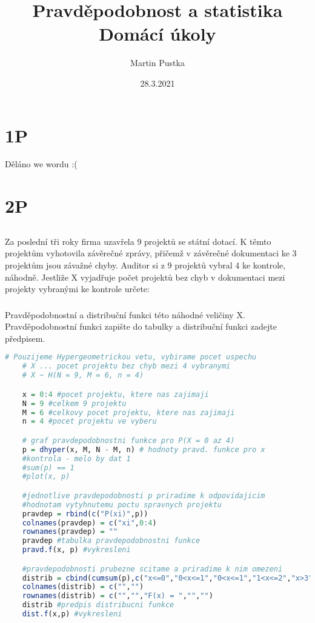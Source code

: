 \documentclass{article}%
\title{Pravděpodobnost a statistika\\
    \large Domácí úkoly}
\date{28.3.2021}
\author{Martin Pustka}
\begin{document}
\maketitle
\newpage
\tableofcontents
\newpage
\section{1P}
    Děláno we wordu :(
\newpage
\section{2P}

\subsection{}
Za poslední tři roky firma uzavřela 9 projektů se státní dotací. K těmto projektům vyhotovila závěrečné zprávy, přičemž v závěrečné dokumentaci ke 3 projektům jsou závažné chyby. Auditor si z 9 projektů  vybral 4 ke kontrole, náhodně. Jestliže X vyjadřuje počet projektů bez chyb v dokumentaci mezi projekty vybranými ke kontrole určete: 

\subsubsection{}
Pravděpodobnostní a distribuční funkci této náhodné veličiny X. Pravděpodobnostní funkci zapište do tabulky a distribuční funkci zadejte předpisem. 
\begin{lstlisting}[language=R, showstringspaces=false, basicstyle=\small]
    # Pouzijeme Hypergeometrickou vetu, vybirame pocet uspechu
    # X ... pocet projektu bez chyb mezi 4 vybranymi
    # X ~ H(N = 9, M = 6, n = 4)

    x = 0:4 #pocet projektu, ktere nas zajimaji
    N = 9 #celkem 9 projektu
    M = 6 #celkovy pocet projektu, ktere nas zajimaji
    n = 4 #pocet projektu ve vyberu

    # graf pravdepodobnostni funkce pro P(X = 0 az 4)
    p = dhyper(x, M, N - M, n) # hodnoty pravd. funkce pro x
    #kontrola - melo by dat 1
    #sum(p) == 1
    #plot(x, p)

    #jednotlive pravdepodobnosti p priradime k odpovidajicim 
    #hodnotam vytyhnutemu poctu spravnych projektu
    pravdep = rbind(c("P(xi)",p))
    colnames(pravdep) = c("xi",0:4)
    rownames(pravdep) = ""
    pravdep #tabulka pravdepodobnostni funkce
    pravd.f(x, p) #vykresleni

    #pravdepodobnosti prubezne scitame a priradime k nim omezeni
    distrib = cbind(cumsum(p),c("x<=0","0<x<=1","0<x<=1","1<x<=2","x>3"))
    colnames(distrib) = c("","")
    rownames(distrib) = c("","","F(x) = ","","")
    distrib #predpis distribucni funkce
    dist.f(x,p) #vykresleni
\end{lstlisting}
\end{document}
